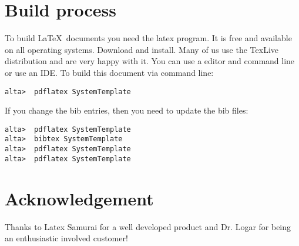 \section{Build process}

To build \LaTeX\ documents you need the latex program.  It is free and available on all operating systems.   Download and install.  Many of us use the TexLive distribution and are very happy with it.    You can use a editor and command line or use an IDE.  To build this document via command line:

\begin{verbatim}
alta>  pdflatex SystemTemplate
\end{verbatim}
If you change the bib entries, then you need to update the bib files:
\begin{verbatim}
alta>  pdflatex SystemTemplate
alta>  bibtex SystemTemplate
alta>  pdflatex SystemTemplate
alta>  pdflatex SystemTemplate
\end{verbatim}


\section*{Acknowledgement}
Thanks to Latex Samurai for a well developed product and Dr. Logar for being an enthusiastic involved customer!


